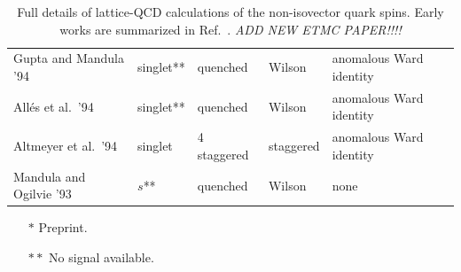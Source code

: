 \begin{table}
{\begin{tabular}{lllll}
  Gupta and Mandula '94 \cite{Gupta:1994qw} &
  singlet** & quenched & Wilson & anomalous Ward identity \\

  Allés et al.\ '94 \cite{Alles:1994ss} &
  singlet** & quenched & Wilson & anomalous Ward identity \\

  Altmeyer et al.\ '94 \cite{Altmeyer:1992nt} &
  singlet & 4 staggered & staggered & anomalous Ward identity \\

  Mandula and Ogilvie '93 \cite{Mandula:1992bc} &
  $s$** & quenched & Wilson & none \\
  \hline
\end{tabular}
} %
\begin{minipage}{\linewidth}
{\footnotesize 
\begin{itemize}
\item[$*$] Preprint.
\item[$**$] No signal available.
\end{itemize}
}
\end{minipage}
\caption{Full details of lattice-QCD calculations of the non-isovector quark spins. Early works are summarized in Ref.~\cite{Liu:1995kb}. \emph{ADD NEW ETMC PAPER!!!!}}
\end{table}



